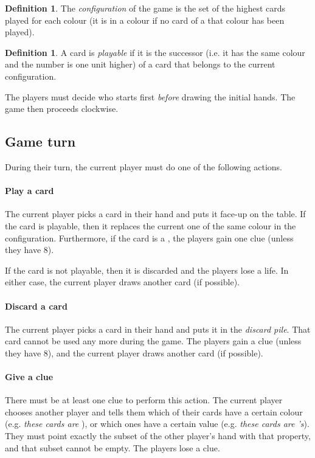 \documentclass[a4paper]{article}
\theoremstyle{plain}
\theoremstyle{definition}
\newtheorem{definition}[theorem]{Definition}
\begin{document}
\begin{definition}
	The \textit{configuration} of the game is the set of the highest cards played for each colour (it is  in a colour if no card of a that colour has been played).
\end{definition}

\begin{definition}
	A card is \textit{playable} if it is the successor (i.e. it has the same colour and the number is one unit higher) of a card that belongs to the current configuration.
\end{definition}

The players must decide who starts first \textit{before} drawing the initial hands. The game then proceeds clockwise.

\subsection{Game turn}

During their turn, the current player must do one of the following actions.

\paragraph{Play a card} The current player picks a card in their hand and puts it face-up on the table. If the card is playable, then it replaces the current one of the same colour in the configuration. Furthermore, if the card is a , the players gain one clue (unless they have 8).

If the card is not playable, then it is discarded and the players lose a life. In either case, the current player draws another card (if possible).

\paragraph{Discard a card} The current player picks a card in their hand and puts it in the \textit{discard pile}. That card cannot be used any more during the game. The players gain a clue (unless they have 8), and the current player draws another card (if possible).

\paragraph{Give a clue} There must be at least one clue to perform this action. The current player chooses another player and tells them which of their cards have a certain colour (e.g. \textit{these cards are }), or which ones have a certain value (e.g. \textit{these cards are 's}). They must point exactly the subset of the other player's hand with that property, and that subset cannot be empty. The players lose a clue.
\end{document}
